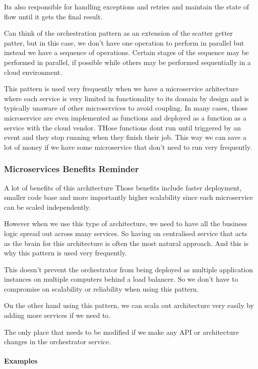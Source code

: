 \documentclass[a4paper, 11pt]{book}
\begin{document}
    Its also responsible for handling exceptions and retries and maintain the state of flow until it gets the final result.

    Can think of the orchestration pattern as an extension of the scatter getter patter, but in this case, we don't have one operation to perform in parallel but instead we have a sequence of operations.
    Certain stages of the sequence may be performed in parallel, if possible while others may be performed sequentially in a cloud environment.

    This pattern is used very frequently when we have a microservice arhitecture where each service is very limited in functionality to its domain by design and is typically unaware of other microservices to avoid coupling.
    In many cases, those microservice are even implemented as functions and deployed as a function as a service with the cloud vendor.
    THose functions dont run until triggered by an event and they stop running when they finish their job.
    This way we can save a lot of money if we have some microservice that don't need to run very frequently.

    \subsubsection{Microservices Benefits Reminder}
    A lot of benefits of this architecture
    Those benefits include faster deployment, smaller code base and more importantly higher scalability since each microservice can be scaled independently.

    However when we use this type of architecture, we need to have all the business logic spread out across many services.
    So having on centralised service that acts as the brain for this architecture is often the most natural approach.
    And this is why this pattern is used very frequently.

    This doesn't prevent the orchestrator from being deployed as multiple application instances on multiple computers behind a load balancer.
    So we don't have to compromise on scalability or reliability when using this pattern.

    On the other hand using this pattern, we can scala out architecture very easily by adding more services if we need to.

    The only place that needs to be modified if we make any API or architecture changes in the orchestrator service.

    \paragraph{Examples}
\end{document}
